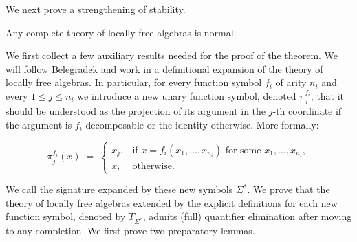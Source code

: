 \documentclass[a4paper,11pt]{article}
\begin{document}
We next prove a strengthening of stability. 

\begin{theorem}\label{NormalProof}
Any complete theory of locally free algebras is normal.
\end{theorem}

We first collect a few auxiliary results needed for the proof of the theorem. We will follow Belegradek \cite{Belegradek1988LocallyFree} and work in a definitional expansion of the theory of locally free algebras. In particular, for every function symbol $f_i$ of arity $n_i$ and every $1\leq j\leq n_i$ we introduce a new unary function symbol, denoted $\pi_j^{f_i}$, that it should be understood as the projection of its argument in the $j$-th coordinate if the argument is $f_i$-decomposable or the identity otherwise. More formally: 

\[
\pi^{f_i}_j(x) \;=\;
\begin{cases}
x_j, & \text{if } x = f_i(x_1,\dots,x_{n_i}) \text{ for some } x_1,\dots,x_{n_i},\\[4pt]
x, & \text{otherwise.}
\end{cases}
\]

We call the signature expanded by these new symbols $\Sigma^*$. We prove that the theory of locally free algebras extended by the explicit definitions for each new function symbol, denoted by $T_{\Sigma^*}$, admits (full) quantifier elimination after moving to any completion. We first prove two preparatory lemmas. 
\end{document}
